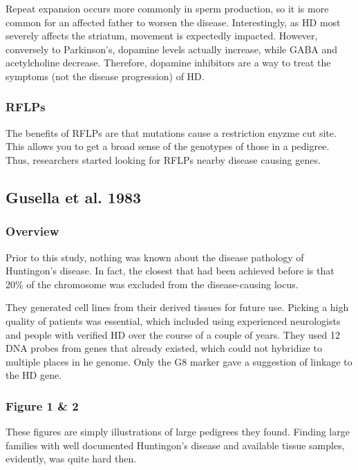 \documentclass[12pt]{report}
\begin{document}
Repeat expansion occurs more commonly in sperm production, so it is more common for an affected father to worsen the disease. Interestingly, as HD most severely affects the striatum, movement is expectedly impacted. However, conversely to Parkinson's, dopamine levels actually increase, while GABA and acetylcholine decrease. Therefore, dopamine inhibitors are a way to treat the symptoms (not the disease progression) of HD. 

\subsubsection{RFLPs}

The benefits of RFLPs are that mutations cause a restriction enyzme cut site. This allows you to get a broad sense of the genotypes of those in a pedigree. Thus, researchers started looking for RFLPs nearby disease causing genes. 



\subsection{Gusella et al. 1983}

\subsubsection{Overview}
Prior to this study, nothing was known about the disease pathology of Huntingon's disease. In fact, the closest that had been achieved before is that 20\% of the chromosome was excluded from the disease-causing locus.\newline

They generated cell lines from their derived tissues for future use. Picking a high quality of patients was essential, which included using experienced neurologists and people with verified HD over the course of a couple of years. They used 12 DNA probes from genes that already existed, which could not hybridize to multiple places in he genome. Only the G8 marker gave a suggestion of linkage to the HD gene. 

\subsubsection{Figure 1 \& 2}

These figures are simply illustrations of large pedigrees they found. Finding large families with well documented Huntingon's disease and available tissue samples, evidently, was quite hard then. 
\end{document}
